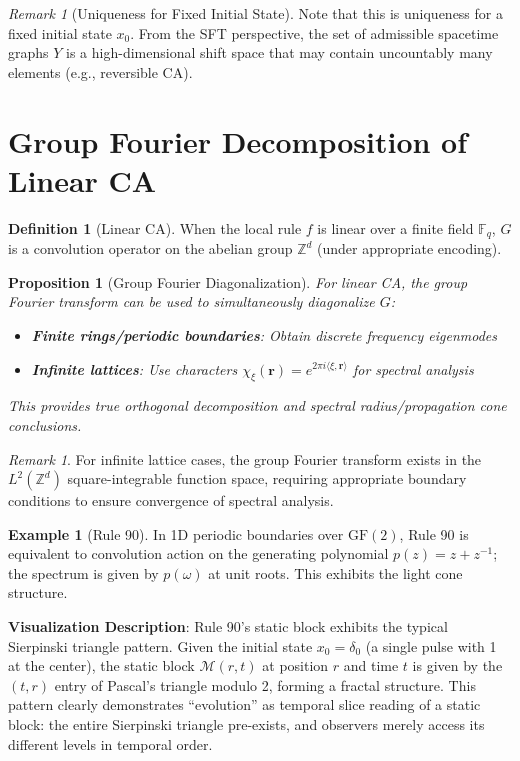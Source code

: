 \documentclass[11pt]{article}
\newtheorem{proposition}[theorem]{Proposition}
\theoremstyle{definition}
\newtheorem{definition}[theorem]{Definition}
\newtheorem{example}[theorem]{Example}
\theoremstyle{remark}
\newtheorem{remark}[theorem]{Remark}
\begin{document}
\begin{remark}[Uniqueness for Fixed Initial State]
Note that this is uniqueness for a fixed initial state \( x_0 \). From the SFT perspective, the set of admissible spacetime graphs \( Y \) is a high-dimensional shift space that may contain uncountably many elements (e.g., reversible CA).
\end{remark}

\section{Group Fourier Decomposition of Linear CA}\label{sec:linear}

\begin{definition}[Linear CA]\label{def:linear}
When the local rule \( f \) is linear over a finite field \( \mathbb{F}_q \), \( G \) is a convolution operator on the abelian group \( \mathbb{Z}^d \) (under appropriate encoding).
\end{definition}

\begin{proposition}[Group Fourier Diagonalization]\label{prop:fourier}
For linear CA, the group Fourier transform can be used to simultaneously diagonalize \( G \):
\begin{itemize}
\item \textbf{Finite rings/periodic boundaries}: Obtain discrete frequency eigenmodes
\item \textbf{Infinite lattices}: Use characters \( \chi_\xi(\mathbf{r}) = e^{2\pi i \langle \xi, \mathbf{r} \rangle} \) for spectral analysis
\end{itemize}
This provides true orthogonal decomposition and spectral radius/propagation cone conclusions.
\end{proposition}

\begin{remark}
For infinite lattice cases, the group Fourier transform exists in the \( L^2(\mathbb{Z}^d) \) square-integrable function space, requiring appropriate boundary conditions to ensure convergence of spectral analysis.
\end{remark}

\begin{example}[Rule 90]\label{ex:rule90}
In 1D periodic boundaries over \( \text{GF}(2) \), Rule 90 is equivalent to convolution action on the generating polynomial \( p(z) = z + z^{-1} \); the spectrum is given by \( p(\omega) \) at unit roots. This exhibits the light cone structure.

\textbf{Visualization Description}: Rule 90's static block exhibits the typical Sierpinski triangle pattern. Given the initial state \( x_0 = \delta_0 \) (a single pulse with 1 at the center), the static block \( \mathcal{M}(r,t) \) at position \( r \) and time \( t \) is given by the \( (t,r) \) entry of Pascal's triangle modulo 2, forming a fractal structure. This pattern clearly demonstrates ``evolution'' as temporal slice reading of a static block: the entire Sierpinski triangle pre-exists, and observers merely access its different levels in temporal order.
\end{example}
\end{document}
